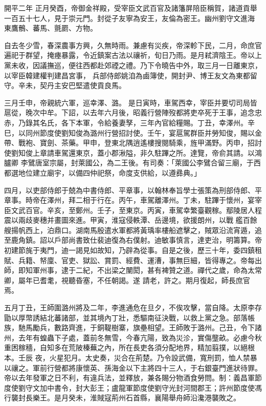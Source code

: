 
\begin{pinyinscope}

 開平二年
 正月癸酉，帝御金祥殿，受宰臣文武百官及諸籓屏陪臣稱賀，諸道貢舉一百五十七人，見于崇元門。封從子友寧為安王，友倫為密王。幽州劉守文進海
 東鷹鶻、蕃馬、氈罽、方物。


自去冬少雪，春深農事方興，久無時雨。兼慮有災疾，帝深軫下民，二月，命庶官遍祀于群望，掩瘞暴露，令近鎮案古法以禳祈，旬日乃雨。是月弒濟陰王。帝以上黨未收，因議撫巡，便往西都赴郊禋之禮。乃下令曉告中外，取三月一日離東京，以宰臣韓建權判建昌宮事，
 兵部侍郎姚洎為鹵簿使，開封尹、博王友文為東都留守。辛未，契丹主安巴堅遣使貢良馬。



 三月壬申，帝親統六軍，巡幸澤、潞。
 是日寅時，車駕西幸，宰臣并要切司局皆扈從，晚次中牟。下詔，以去年六月後，昭義行營陣歿都將吏卒死于王事，追念忠赤，乃錄其名氏，各下本軍，令給養妻孥，三年內官給糧賜。丁丑，幸澤州。辛巳，以同州節度使劉知俊為潞州行營招討使。壬午，宴扈駕群臣并勞知俊，賜以金帶、戰袍、寶劍、茶藥。甲申，登東北隅逍遙樓搜閱騎乘，旌甲滿野。丙申，招討使劉知俊上章請車駕還東京，蓋小郡湫隘，非久駐蹕之所。達覽，帝俞其請。以鴻臚卿
 李鷿唐室宗屬，封萊國公，為二王後。有司奏：「萊國公李鷿合留三廟，于西都選地位建立廟宇，以備四仲祀祭，命度支供給，以遵彞典。」



 四月，以吏部侍郎于兢為中書侍郎、平章事，以翰林奉旨學士張策為刑部侍郎、平章事。時帝在澤州，拜二相于行在。丙午，車駕離澤州。丁未，駐蹕于懷州，宴宰臣文武百官。辛亥，至鄭州。壬子，至東京。丙寅，車駕幸繁臺觀稼。鄢陵居人程震以兩歧麥穗并畫圖來進。甲寅，淮寇侵軼潭、岳邊境，欲援朗州，以戰
 艦百餘艘揚帆西上，泊鼎口。湖南馬殷遣水軍都將黃瑀率樓船遮擊之，賊眾沿流宵遁，追至鹿角鎮。詔以戶部尚書致仕裴迪復為右僕射。迪敏事慎言，達吏治，明籌算。帝初建節旄于夷門，迪一謁見如故知，乃辟為從事。自是之後，歷三十年，委四鎮租賦、兵籍、帑廩、官吏、獄訟、賞罰、經費、運漕，事無巨細，皆得專之。帝每出師，即知軍州事，逮于二紀，不出梁之闉閎，甚有裨贊之道。禪代之歲，命為太常卿，屬年已耆耄，視聽昏塞，不任朝謁。遂
 請老，許之。期月復起，師長庶官焉。



 五月丁丑，王師圍潞州將及二年，李進通危在旦夕，不俟攻擊，當自降。太原李存勖以厚幣誘結北蕃諸部，並其境內丁壯，悉驅南征決戰，以救上黨之急。部落帳族，馳馬勵兵，數路齊進，于銅鞮樹寨，旗壘相望。王師敗于潞州。己丑，令下諸州，去年有蝗蟲下子處，蓋前冬無雪，今春亢陽，致為災沴，實傷壟畝。必慮今秋重困稼穡，自知多在荒陂榛蕪之內，所在長吏各須分配地界，精加翦撲，以絕根本。壬辰
 夜，火星犯月。太史奏，災合在荊楚。乃令設武備，寬刑罰，恤人禁暴以禳之。軍前行營都將康懷英、孫海金以下主將四十三人，于右銀臺門進狀待罪。帝以去年發軍之日不利，有違兵法，並釋放，兼各賜分物酒食勞問。制：義昌軍節度使劉守文加中書令，封大彭王；盧龍軍節度使劉守光封河間郡王；許州節度使馮行襲封長樂王。是月癸未，淮賊寇荊州石首縣，襄陽舉舟師沿瀺港襲敗之。




\end{pinyinscope}
